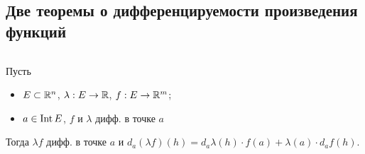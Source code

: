\subsection{Две теоремы о дифференцируемости произведения функций}


\begin{theorem} $ $

    Пусть 
    \begin{itemize}
        \item $E \subset \mathbb{R}^n$, $\lambda : E \to \mathbb{R}$, $f : E \to \mathbb{R}^m$;
        \item $a \in \operatorname{Int} E$, $f$ и $\lambda$ дифф. в точке $a$
    \end{itemize}
    Тогда $\lambda f$ дифф. в точке $a$ и $d_a (\lambda f)(h)
    = d_a \lambda (h) \cdot f(a) + \lambda(a) \cdot d_a f(h)$.
\end{theorem}
